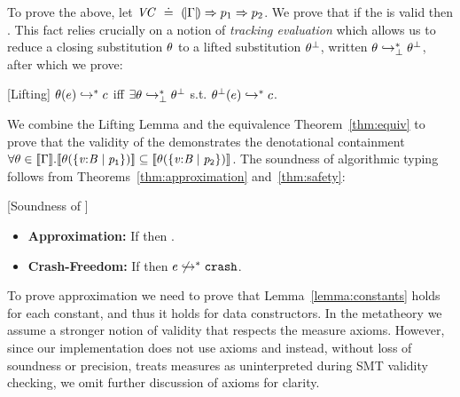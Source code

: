 To prove the above, let ${\mathit{VC} \ \doteq\  (\!|\Gamma|\!) \Rightarrow {p_1} \Rightarrow {p_2}}$. 
We prove that if the \VC is valid then 
.
%
This fact relies crucially on a notion of \emph{tracking evaluation} 
which allows us to reduce a closing substitution $\theta$ to a lifted substitution 
$\theta^\perp$, written $\theta \hookrightarrow_{\perp}^{*} \theta^\perp$, after which we prove:

\begin{lemma}{[Lifting]} 
$\theta(e) \hookrightarrow_{}^{*} c$ iff $\exists \theta \hookrightarrow_{\perp}^{*} \theta^\perp$ s.t. $\theta^\perp(e) \hookrightarrow_{}^{*} c$.
\end{lemma}

We combine the Lifting Lemma and the equivalence Theorem~\ref{thm:equiv} 
to prove that the validity of the \VC demonstrates 
the denotational containment
$\forall \sto\in \interp{\Env}. 
  		 \interp{\thetasub{\sto}{\ttreft{\vv}{\miBase}{\p_1}}} 
  		\subseteq   \interp{\thetasub{\sto}{\ttreft{\vv}{\miBase}{\p_2}}}$.
%
The soundness of algorithmic typing follows from
Theorems~\ref{thm:approximation} and~\ref{thm:safety}:

\begin{theorem} {[Soundness of \declang]} 
\begin{itemize}
\item\textbf{Approximation:} If  then
  .
\item\textbf{Crash-Freedom:} If  
        then $e\not \hookrightarrow_{}^{*} \mathtt{crash}$.
\end{itemize}
\end{theorem}

To prove approximation we need to prove that Lemma~\ref{lemma:constants} holds for
each constant, and thus it holds for data 
constructors.
In the metatheory we assume a stronger notion 
of validity that respects the measure axioms. 
%
However, since our implementation does not use axioms and instead, 
without loss of soundness or precision, treats measures as uninterpreted 
during SMT validity checking, we omit further discussion of axioms 
for clarity.



